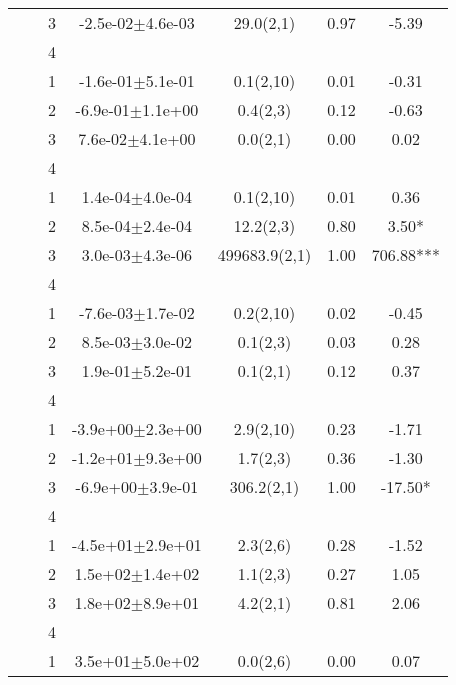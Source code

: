 \begin{longtable}[H]{llccccS[table-format=-2.2, table-space-text-post = {***}]}
   &  & 3 & -2.5e-02$\pm$4.6e-03 & 29.0(2,1) & 0.97 & -5.39 \\* 
   &  & 4 &  &  &  &  \\
   \midrule
{} & {} & 1 & -1.6e-01$\pm$5.1e-01 & 0.1(2,10) & 0.01 & -0.31 \\* 
   &  & 2 & -6.9e-01$\pm$1.1e+00 & 0.4(2,3) & 0.12 & -0.63 \\* 
   &  & 3 &  7.6e-02$\pm$4.1e+00 & 0.0(2,1) & 0.00 & 0.02 \\* 
   &  & 4 &  &  &  &  \\
   \midrule
{} & {} & 1 &  1.4e-04$\pm$4.0e-04 & 0.1(2,10) & 0.01 & 0.36 \\* 
   &  & 2 &  8.5e-04$\pm$2.4e-04 & 12.2(2,3) & 0.80 & 3.50* \\* 
   &  & 3 &  3.0e-03$\pm$4.3e-06 & 499683.9(2,1) & 1.00 & 706.88*** \\* 
   &  & 4 &  &  &  &  \\
   \midrule
{} & {} & 1 & -7.6e-03$\pm$1.7e-02 & 0.2(2,10) & 0.02 & -0.45 \\* 
   &  & 2 &  8.5e-03$\pm$3.0e-02 & 0.1(2,3) & 0.03 & 0.28 \\* 
   &  & 3 &  1.9e-01$\pm$5.2e-01 & 0.1(2,1) & 0.12 & 0.37 \\* 
   &  & 4 &  &  &  &  \\
   \midrule
{} & {} & 1 & -3.9e+00$\pm$2.3e+00 & 2.9(2,10) & 0.23 & -1.71 \\* 
   &  & 2 & -1.2e+01$\pm$9.3e+00 & 1.7(2,3) & 0.36 & -1.30 \\* 
   &  & 3 & -6.9e+00$\pm$3.9e-01 & 306.2(2,1) & 1.00 & -17.50* \\* 
   &  & 4 &  &  &  &  \\
   \midrule
{} & {} & 1 & -4.5e+01$\pm$2.9e+01 & 2.3(2,6) & 0.28 & -1.52 \\* 
   &  & 2 &  1.5e+02$\pm$1.4e+02 & 1.1(2,3) & 0.27 & 1.05 \\* 
   &  & 3 &  1.8e+02$\pm$8.9e+01 & 4.2(2,1) & 0.81 & 2.06 \\* 
   &  & 4 &  &  &  &  \\
   \midrule
{} & {} & 1 &  3.5e+01$\pm$5.0e+02 & 0.0(2,6) & 0.00 & 0.07 \\* 

\end{longtable}

